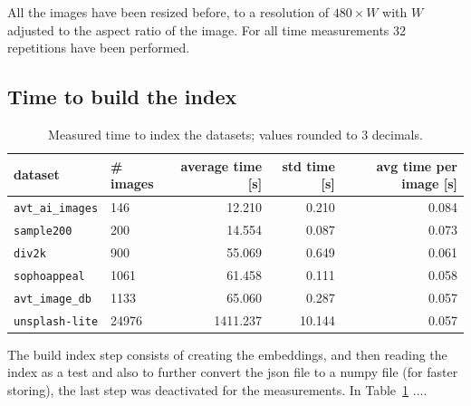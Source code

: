 \documentclass{article}
\begin{document}
All the images have been resized before, to a resolution of $480\times W$ with $W$ adjusted to the aspect ratio of the image.
For all time measurements 32 repetitions have been performed.

\subsection{Time to build the index}

\begin{table}[htb!]
\centering
\caption{Measured time to index the datasets; values rounded to 3 decimals.}
\label{tbl:measured_time_to_index_the_datasets_}
\begin{tabular}{llrrr}
\toprule
dataset                  & \# images & average time [s] & std time [s] & avg time per image [s] \\
\midrule
\texttt{avt\_ai\_images} & 146       & 12.210            & 0.210         & 0.084 \\
\texttt{sample200}       & 200       & 14.554           & 0.087        & 0.073 \\
\texttt{div2k}           & 900       & 55.069           & 0.649        & 0.061 \\
\texttt{sophoappeal}     & 1061      & 61.458           & 0.111        & 0.058 \\
\texttt{avt\_image\_db}  & 1133      & 65.060            & 0.287        & 0.057 \\
\texttt{unsplash-lite}   & 24976     & 1411.237         & 10.144       & 0.057 \\
\bottomrule
\end{tabular}
\end{table}







The build index step consists of creating the embeddings, and then reading the index as a test and also to further convert the json file to a numpy file (for faster storing), the last step was deactivated for the measurements.
In Table~\ref{tbl:measured_time_to_index_the_datasets_} ....
\end{document}
